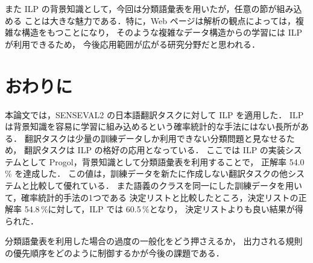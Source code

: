 また ILP の背景知識として，今回は分類語彙表を用いたが，任意の節が組み込める
ことは大きな魅力である．特に，Web ページは解析の観点によっては，複雑な構造をもつことになり，
そのような複雑なデータ構造からの学習には ILP が利用できるため，
今後応用範囲が広がる研究分野だと思われる．


\section{おわりに}


本論文では，SENSEVAL2 の日本語翻訳タスクに対して ILP を適用した．
ILP は背景知識を容易に学習に組み込めるという確率統計的な手法にはない長所がある．
翻訳タスクは少量の訓練データしか利用できない分類問題と見なせるため，
翻訳タスクは ILP の格好の応用となっている．
ここでは ILP の実装システムとして Progol，背景知識として分類語彙表を利用することで，
正解率 54.0\,\% を達成した．
この値は，訓練データを新たに作成しない翻訳タスクの他システムと比較して優れている．
また語義のクラスを同一にした訓練データを用いて，確率統計的手法の1つである
決定リストと比較したところ，決定リストの正解率 54.8\,\%に対して，ILP では 60.5\,\%となり，
決定リストよりも良い結果が得られた．

分類語彙表を利用した場合の過度の一般化をどう押さえるか，
出力される規則の優先順序をどのように制御するかが今後の課題である．







\begin{biography}


\end{biography}


